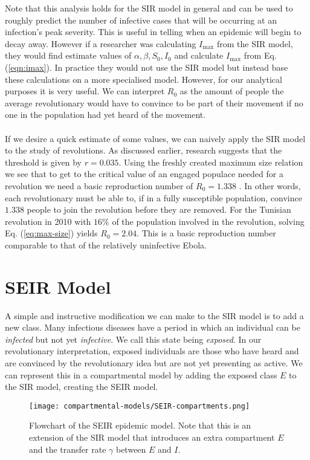 Note that this analysis holds for the SIR model in general and can be used to roughly predict the number of infective cases that will be occurring at an infection's peak severity. This is useful in telling when an epidemic will begin to decay away. However if a researcher was calculating $I_{\max}$ from the SIR model, they would find estimate values of $\alpha,\beta,S_0,I_0$ and calculate $I_{\max}$ from Eq. (\eqref{eqn:imax}). In practice they would not use the SIR model but instead base these calculations on a more specialised model. However, for our analytical purposes it is very useful. We can interpret $R_0$ as the amount of people the average revolutionary would have to convince to be part of their movement if no one in the population had yet heard of the movement.\\
\\
If we desire a quick estimate of some values, we can naively apply the SIR model to the study of revolutions. As discussed earlier, research suggests that the threshold is given by $r=0.035$. Using the freshly created maximum size relation we see that to get to the critical value of an engaged populace needed for a revolution we need a basic reproduction number of $R_0=1.338$ . In other words, each revolutionary must be able to, if in a fully susceptible population, convince $1.338$ people to join the revolution before they are removed. For the Tunisian revolution in 2010 with $16\%$ of the population involved in the revolution\cite{arab-spring-percent}, solving Eq. (\ref{eq:max-size}) yields $R_0=2.04$.\label{mmd} This is a basic reproduction number comparable to that of the relatively uninfective Ebola\cite{b-r-n}.
\section{SEIR Model}
A simple and instructive modification we can make to the SIR model is to add a new class. Many infectious diseases have a period in which an individual can be \textit{infected} but not yet \textit{infective}. We call this state being \textit{exposed}. In our revolutionary interpretation, exposed individuals are those who have heard and are convinced by the revolutionary idea but are not yet presenting as active. We can represent this in a compartmental model by adding the exposed class $E$ to the SIR model, creating the SEIR model. 
\begin{figure}[h]
	\centering
	\texttt{[image: compartmental-models/SEIR-compartments.png]}
	\caption{Flowchart of the SEIR epidemic model. Note that this is an extension of the SIR model that introduces an extra compartment $E$ and the transfer rate $\gamma$ between $E$ and $I$.}
\end{figure}

